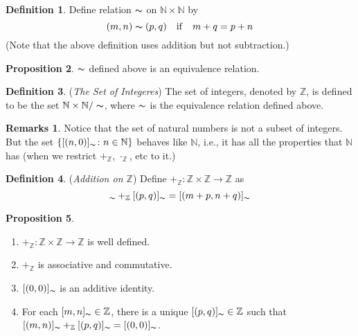 \documentclass[14pt]{article}
\theoremstyle{definition}
\newtheorem*{remark}{Remarks}
\newtheorem{definition}{Definition}[subsection]
\newtheorem{proposition}[definition]{Proposition}
\newcommand{\eq}{\thicksim}
\newcommand{\bb}[1]{\mathbb{#1}}
\begin{document}
\begin{definition}
    Define relation $\eq$ on $\bb{N}\times\bb{N}$ by
    \begin{equation*}
        (m,n)\eq (p,q) \quad \mathrm{if} \quad m+q=p+n
    \end{equation*}
    (Note that the above definition uses addition but not subtraction.)
\end{definition}

\begin{proposition}
    $\eq$ defined above is an equivalence relation.
\end{proposition}

\begin{definition}
    (\textit{The Set of Integeres}) The set of integers, denoted by $\bb{Z}$,  is defined to be the set $\bb{N}\times \bb{N}/\eq$,
     where $\eq$ is the equivalence relation defined above.
\end{definition}

\begin{remark}
    Notice that the set of natural numbers is not a subset of integers. But
    the set $\{[(n,0)]_{\eq}\colon n\in\bb{N}\}$ behaves like $\bb{N}$, i.e., it has all
    the properties that $\bb{N}$ has (when we restrict $+_{\bb{Z}}$, $\cdot_{\bb{Z}}$, etc to it.)

\end{remark}
\begin{definition}
    (\textit{Addition on $\bb{Z}$}) Define $+_{\bb{Z}}\colon \bb{Z}\times\bb{Z}\rightarrow \bb{Z}$ as
    \begin{equation*}
        [(m,n)]_{\eq}+_{\bb{Z}}[(p,q)]_{\eq}=[(m+p, n+q)]_{\eq}
    \end{equation*}
\end{definition}

\begin{proposition}
    \hfill
    \begin{enumerate}
        \item $+_{\bb{Z}}\colon \bb{Z}\times\bb{Z}\rightarrow \bb{Z}$ is well defined.
        \item $+_{\bb{Z}}$ is associative and commutative.
        \item $[(0,0)]_{\eq}$ is an additive identity.
        \item For each $[m,n]_{\eq}\in\bb{Z}$, there is a unique $[(p,q)]_{\eq}\in\bb{Z}$ 
              such that $[(m,n)]_{\eq}+_{\bb{Z}}[(p,q)]_{\eq}=[(0,0)]_{\eq}$.
    \end{enumerate}
\end{proposition}
\end{document}
